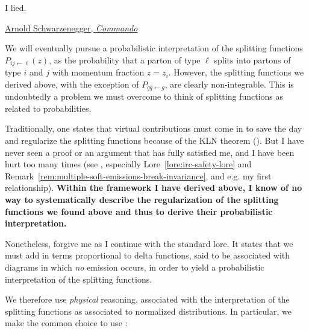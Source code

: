 \epigraph{I lied.}{\href{https://www.youtube.com/watch?v=_wk-jT9rn-8}{Arnold Schwarzenegger, \textit{Commando}}}

We will eventually pursue a probabilistic interpretation of the splitting functions \(P_{ij \leftarrow \ell}(z)\), as the probability that a parton of type \(\ell\) splits into partons of type \(i\) and \(j\) with momentum fraction \(z = z_i\).
%
However, the splitting functions we derived above, with the exception of \(P_{q\overline{q} \leftarrow g}\), are clearly non-integrable.
%
This is undoubtedly a problem we must overcome to think of splitting functions as related to probabilities.

Traditionally, one states that virtual contributions must come in to save the day and regularize the splitting functions because of the KLN theorem ().
%
But I have never seen a proof or an argument that has fully satisfied me, and I have been hurt too many times (see , especially Lore~\ref{lore:irc-safety-lore} and Remark~\ref{rem:multiple-soft-emissions-break-invariance}, and e.g. my first relationship).
%
\textbf{Within the framework I have derived above, I know of no way to systematically describe the regularization of the splitting functions we found above and thus to derive their probabilistic interpretation.}

Nonetheless, forgive me as I continue with the standard lore.
%
It states that we must add in terms proportional to delta functions, said to be associated with diagrams in which \textit{no} emission occurs, in order to yield a probabilistic interpretation of the splitting functions.

We therefore use \textit{physical} reasoning, associated with the interpretation of the splitting functions as associated to normalized distributions.
%
In particular, we make the common choice to use :

